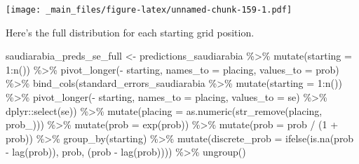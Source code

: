 \documentclass[
]{book}
\newenvironment{Shaded}{\begin{snugshade}}{\end{snugshade}}
\newcommand{\AttributeTok}[1]{\textcolor[rgb]{0.77,0.63,0.00}{#1}}
\newcommand{\DecValTok}[1]{\textcolor[rgb]{0.00,0.00,0.81}{#1}}
\newcommand{\FunctionTok}[1]{\textcolor[rgb]{0.00,0.00,0.00}{#1}}
\newcommand{\NormalTok}[1]{#1}
\newcommand{\OtherTok}[1]{\textcolor[rgb]{0.56,0.35,0.01}{#1}}
\newcommand{\SpecialCharTok}[1]{\textcolor[rgb]{0.00,0.00,0.00}{#1}}
\newcommand{\StringTok}[1]{\textcolor[rgb]{0.31,0.60,0.02}{#1}}
\begin{document}
\texttt{[image: \_main\_files/figure-latex/unnamed-chunk-159-1.pdf]}

Here's the full distribution for each starting grid position.

\begin{Shaded}
\begin{Highlighting}[]
\NormalTok{saudiarabia\_preds\_se\_full }\OtherTok{\textless{}{-}}\NormalTok{ predictions\_saudiarabia }\SpecialCharTok{\%\textgreater{}\%}
  \FunctionTok{mutate}\NormalTok{(}\AttributeTok{starting =} \DecValTok{1}\SpecialCharTok{:}\FunctionTok{n}\NormalTok{()) }\SpecialCharTok{\%\textgreater{}\%}
  \FunctionTok{pivot\_longer}\NormalTok{(}\SpecialCharTok{{-}}\NormalTok{ starting, }\AttributeTok{names\_to =} \StringTok{\textquotesingle{}placing\textquotesingle{}}\NormalTok{, }\AttributeTok{values\_to =} \StringTok{\textquotesingle{}prob\textquotesingle{}}\NormalTok{) }\SpecialCharTok{\%\textgreater{}\%} 
  \FunctionTok{bind\_cols}\NormalTok{(standard\_errors\_saudiarabia }\SpecialCharTok{\%\textgreater{}\%} \FunctionTok{mutate}\NormalTok{(}\AttributeTok{starting =} \DecValTok{1}\SpecialCharTok{:}\FunctionTok{n}\NormalTok{()) }\SpecialCharTok{\%\textgreater{}\%}
  \FunctionTok{pivot\_longer}\NormalTok{(}\SpecialCharTok{{-}}\NormalTok{ starting, }\AttributeTok{names\_to =} \StringTok{\textquotesingle{}placing\textquotesingle{}}\NormalTok{, }\AttributeTok{values\_to =} \StringTok{\textquotesingle{}se\textquotesingle{}}\NormalTok{) }\SpecialCharTok{\%\textgreater{}\%}
\NormalTok{    dplyr}\SpecialCharTok{::}\FunctionTok{select}\NormalTok{(se)) }\SpecialCharTok{\%\textgreater{}\%}
  \FunctionTok{mutate}\NormalTok{(}\AttributeTok{placing =} \FunctionTok{as.numeric}\NormalTok{(}\FunctionTok{str\_remove}\NormalTok{(placing, }\StringTok{\textquotesingle{}prob\_\textquotesingle{}}\NormalTok{))) }\SpecialCharTok{\%\textgreater{}\%}
  \FunctionTok{mutate}\NormalTok{(}\AttributeTok{prob =} \FunctionTok{exp}\NormalTok{(prob)) }\SpecialCharTok{\%\textgreater{}\%}
  \FunctionTok{mutate}\NormalTok{(}\AttributeTok{prob =}\NormalTok{ prob }\SpecialCharTok{/}\NormalTok{ (}\DecValTok{1} \SpecialCharTok{+}\NormalTok{ prob)) }\SpecialCharTok{\%\textgreater{}\%}
  \FunctionTok{group\_by}\NormalTok{(starting) }\SpecialCharTok{\%\textgreater{}\%} 
  \FunctionTok{mutate}\NormalTok{(}\AttributeTok{discrete\_prob =} \FunctionTok{ifelse}\NormalTok{(}\FunctionTok{is.na}\NormalTok{(prob }\SpecialCharTok{{-}} \FunctionTok{lag}\NormalTok{(prob)), prob, (prob }\SpecialCharTok{{-}} \FunctionTok{lag}\NormalTok{(prob)))) }\SpecialCharTok{\%\textgreater{}\%}
  \FunctionTok{ungroup}\NormalTok{()}


\end{Highlighting}
\end{Shaded}
\end{document}
